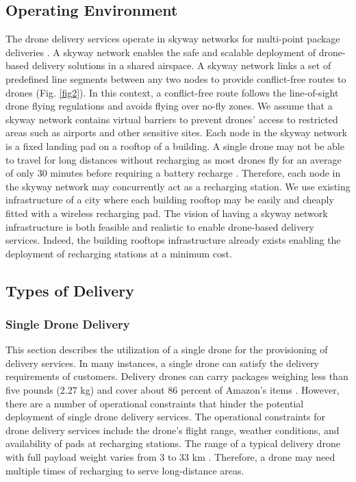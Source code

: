 \documentclass[conference]{IEEEtran}
\begin{document}
\subsection{Operating Environment}
The drone delivery services operate in skyway networks for multi-point package deliveries \cite{9284115}. A skyway network enables the safe and scalable deployment of drone-based delivery solutions in a shared airspace. A skyway network links a set of predefined line segments between any two nodes to provide conflict-free routes to drones (Fig. \ref{fig2}). In this context, a conflict-free route follows the line-of-sight drone flying regulations and avoids flying over no-fly zones. We assume that a skyway network contains virtual barriers to prevent drones’ access to restricted areas such as airports and other sensitive sites. Each node in the skyway network is a fixed landing pad on a rooftop of a building. A single drone may not be able to travel for long distances without recharging as most drones fly for an average of only 30 minutes before requiring a battery recharge \cite{abdallah2019efficient}. Therefore, each node in the skyway network may concurrently act as a recharging station. We use existing infrastructure of a city where each building rooftop may be easily and cheaply fitted with a wireless recharging pad. The vision of having a skyway network infrastructure is both feasible and realistic to enable drone-based delivery services. Indeed, the building rooftops infrastructure already exists enabling the deployment of recharging stations at a minimum cost. 


\subsection{Types of Delivery}

\subsubsection{Single Drone Delivery}
This section describes the utilization of a single drone for the provisioning of delivery services. In many instances, a single drone can satisfy the delivery requirements of customers. Delivery drones can carry packages weighing less than five pounds (2.27 kg) and cover about 86 percent of Amazon's items \cite{doi:10.1111/drev.10313}. However, there are a number of operational constraints that hinder the potential deployment of single drone delivery services. The operational constraints for drone delivery services include the drone's flight range, weather conditions, and availability of pads at recharging stations. The range of a typical delivery drone with full payload weight varies from 3 to 33 km \cite{12}. Therefore, a drone may need multiple times of recharging to serve long-distance areas.
\end{document}
